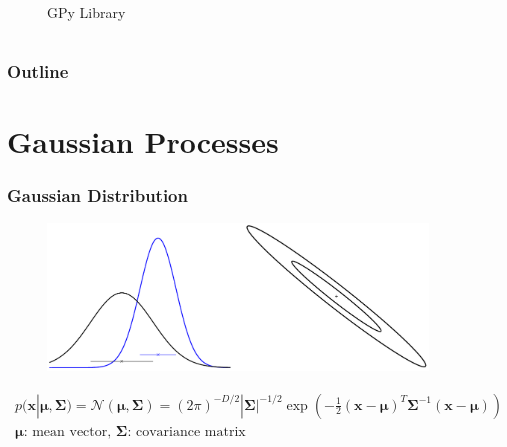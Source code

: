 \documentclass[10pt]{beamer}
\newcommand{\bx}{\mathbf{x}}
\newcommand{\gaussN}{\mathcal{N}}
\newcommand{\bmu}{\boldsymbol{\mu}}
\newcommand{\bSig}{\boldsymbol{\Sigma}}
\begin{document}
\begin{frame}
\begin{columns}
\begin{column}{0.5\textwidth}
\begin{figure}
          \caption*{GPy Library \footnotemark[3]}
        \end{figure}
      \end{column}
    \end{columns}
  \end{frame}

  \begin{frame}[noframenumbering]
    \frametitle{Outline}
    \tableofcontents
  \end{frame}

  \section{Gaussian Processes}
  \begin{frame}
    \frametitle{Gaussian Distribution}

    \begin{figure}
      \centering
      \includegraphics[width=0.9\textwidth]{gaussDist1.png}
    \end{figure}

    \begin{equation*}
      \begin{array}{c}
        p(\bx|\bmu,\bSig) = \gaussN(\bmu,\bSig) = (2\pi)^{-D/2} |\bSig|^{-1/2} \exp \left( - \frac{1}{2} (\bx - \bmu)^T \bSig^{-1} (\bx - \bmu) \right) \\
        \bmu \text{: mean vector, } \bSig \text{: covariance matrix}
      \end{array}
    \end{equation*}
  \end{frame}
\end{document}
